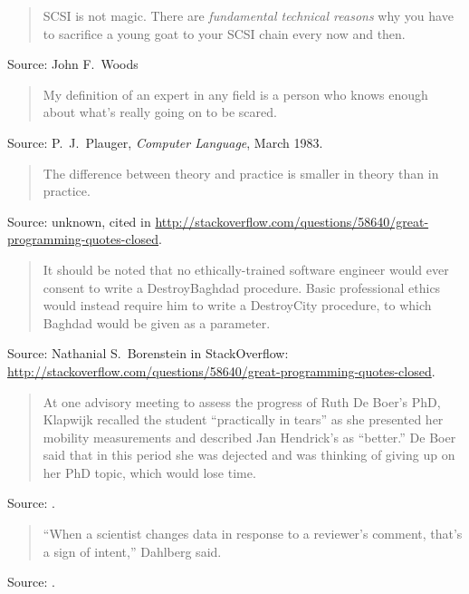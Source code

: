 \documentclass[a4paper]{article}
\begin{document}
\begin{quote}
	SCSI is not magic. There are \emph{fundamental technical
	reasons} why you have to sacrifice a young goat to your
	SCSI chain every now and then.
\end{quote}
Source: John F.~Woods
\medskip

\begin{quote}
	My definition of an expert in any field is a person who knows
	enough about what's really going on to be scared.
\end{quote}
Source: P.~J.~Plauger, {\it Computer Language}, March 1983.
\medskip

\begin{quote}
	The difference between theory and practice is smaller in theory
	than in practice.
\end{quote}
Source: unknown, cited in 
\url{http://stackoverflow.com/questions/58640/great-programming-quotes-closed}.
\medskip

\begin{quote}
	It should be noted that no ethically-trained software engineer
	would ever consent to write a DestroyBaghdad procedure.  Basic
	professional ethics would instead require him to write a
	DestroyCity procedure, to which Baghdad would be given as a
	parameter.
\end{quote}
Source: Nathanial S.~Borenstein in StackOverflow:
\url{http://stackoverflow.com/questions/58640/great-programming-quotes-closed}.
\medskip

\begin{quote}
	At one advisory meeting to assess the progress of Ruth De Boer's
	PhD, Klapwijk recalled the student ``practically in tears'' as
	she presented her mobility measurements and described Jan
	Hendrick's as ``better.''  De Boer said that in this period she
	was dejected and was thinking of giving up on her PhD topic,
	which would lose time.
\end{quote}
Source: \citet[p.~140]{Reich2009}.
\medskip

\begin{quote}
	``When a scientist changes data in response to a reviewer's
	comment, that's a sign of intent,'' Dahlberg said.
\end{quote}
Source: \citet[p.~123]{Reich2009}.
\medskip
\end{document}
